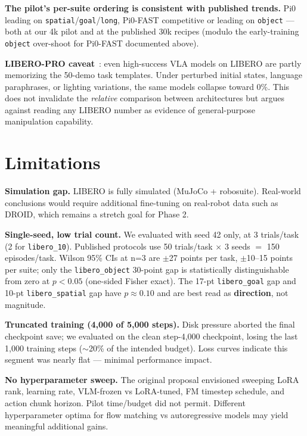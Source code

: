 \documentclass[11pt,letterpaper]{article}
\begin{document}
\textbf{The pilot's per-suite ordering is consistent with published trends.} Pi0 leading on \texttt{spatial}/\texttt{goal}/\texttt{long}, Pi0-FAST competitive or leading on \texttt{object} --- both at our 4k pilot and at the published 30k recipes (modulo the early-training \texttt{object} over-shoot for Pi0-FAST documented above).

\begin{callout}
\textbf{LIBERO-PRO caveat}~\cite{liberopro2025}: even high-success VLA models on LIBERO are partly memorizing the 50-demo task templates. Under perturbed initial states, language paraphrases, or lighting variations, the same models collapse toward 0\%. This does not invalidate the \emph{relative} comparison between architectures but argues against reading any LIBERO number as evidence of general-purpose manipulation capability.
\end{callout}

\section{Limitations}

\textbf{Simulation gap.} LIBERO is fully simulated (MuJoCo + robosuite). Real-world conclusions would require additional fine-tuning on real-robot data such as DROID, which remains a stretch goal for Phase 2.

\textbf{Single-seed, low trial count.} We evaluated with seed 42 only, at 3 trials/task (2 for \texttt{libero\_10}). Published protocols use 50 trials/task $\times$ 3 seeds $=$ 150 episodes/task. Wilson 95\% CIs at n=3 are $\pm$27 points per task, $\pm$10--15 points per suite; only the \texttt{libero\_object} 30-point gap is statistically distinguishable from zero at $p < 0.05$ (one-sided Fisher exact). The 17-pt \texttt{libero\_goal} gap and 10-pt \texttt{libero\_spatial} gap have $p \approx 0.10$ and are best read as \textbf{direction}, not magnitude.

\textbf{Truncated training (4{,}000 of 5{,}000 steps).} Disk pressure aborted the final checkpoint save; we evaluated on the clean step-4{,}000 checkpoint, losing the last 1{,}000 training steps ($\sim$20\% of the intended budget). Loss curves indicate this segment was nearly flat --- minimal performance impact.

\textbf{No hyperparameter sweep.} The original proposal envisioned sweeping LoRA rank, learning rate, VLM-frozen vs LoRA-tuned, FM timestep schedule, and action chunk horizon. Pilot time/budget did not permit. Different hyperparameter optima for flow matching vs autoregressive models may yield meaningful additional gains.
\end{document}
